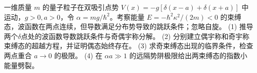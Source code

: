 一维质量 \(m\) 的量子粒子在双吸引点势 \(V(x)=-g[\delta(x-a)+\delta(x+a)]\) 中运动，\(g>0,a>0\)，令 \(\alpha=mg/\hbar^2\)。考察能量 \(E=-\hbar^2\kappa^2/(2m)<0\) 的束缚态，波函数在两点连续，但导数满足分布势导致的跳跃条件；忽略自旋。
(1) 推导两个\(\delta \)点处的波函数导数跳跃条件与奇偶宇称分解。
(2) 分别建立偶宇称和奇宇称束缚态的超越方程，并证明偶态始终存在。
(3) 求奇束缚态出现的临界条件，检查两点重合 \(a\to0\) 的极限。
(4) 在 \(\alpha a\gg1\) 的远隔势阱极限给出两束缚态的指数小能量劈裂。
